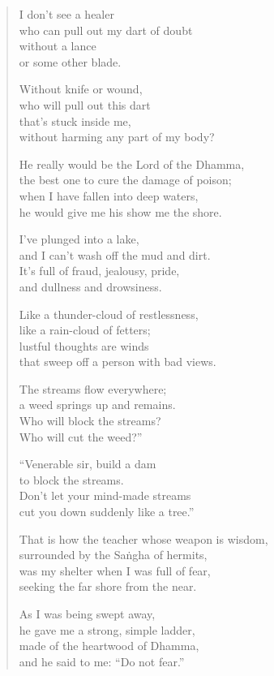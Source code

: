 \documentclass[12pt,openany]{book}%
\begin{document}
\begin{verse}
I don’t see a healer \\
who can pull out my dart of doubt \\
without a lance \\
or some other blade. 

Without knife or wound, \\
who will pull out this dart \\
that’s stuck inside me, \\
without harming any part of my body? 

He really would be the Lord of the Dhamma, \\
the best one to cure the damage of poison; \\
when I have fallen into deep waters, \\
he would give me his show me the shore. 

I’ve plunged into a lake, \\
and I can’t wash off the mud and dirt. \\
It’s full of fraud, jealousy, pride, \\
and dullness and drowsiness. 

Like a thunder-cloud of restlessness, \\
like a rain-cloud of fetters; \\
lustful thoughts are winds \\
that sweep off a person with bad views. 

The streams flow everywhere; \\
a weed springs up and remains. \\
Who will block the streams? \\
Who will cut the weed?” 

“Venerable sir, build a dam \\
to block the streams. \\
Don’t let your mind-made streams \\
cut you down suddenly like a tree.” 

That is how the teacher whose weapon is wisdom, \\
surrounded by the \textsanskrit{Saṅgha} of hermits, \\
was my shelter when I was full of fear, \\
seeking the far shore from the near. 

As I was being swept away, \\
he gave me a strong, simple ladder, \\
made of the heartwood of Dhamma, \\
and he said to me: “Do not fear.” 


\end{verse}
\end{document}
